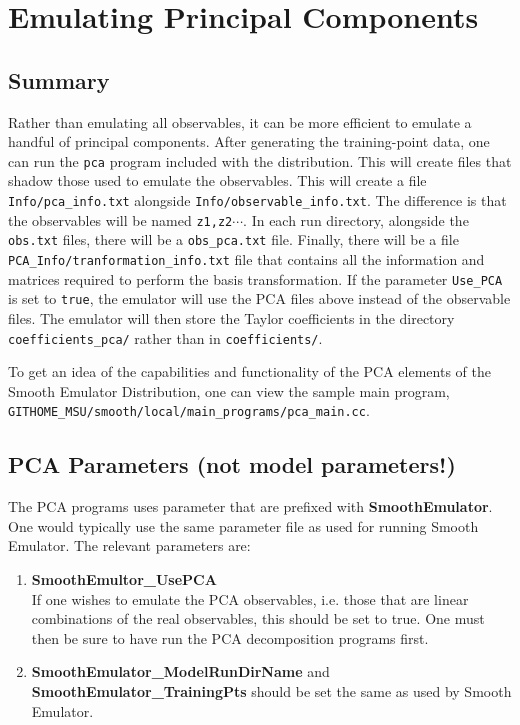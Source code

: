 \documentclass[main.tex]{subfiles}
\begin{document}
\setcounter{section}{5}
\section{Emulating Principal Components}\label{sec:pca}

\subsection{Summary}

Rather than emulating all observables, it can be more efficient to emulate a handful of principal components. After generating the training-point data, one can run the {\tt pca} program included with the distribution. This will create files that shadow those used to emulate the observables. This will create a file {\tt Info/pca\_info.txt} alongside {\tt Info/observable\_info.txt}. The difference is that the observables will be named {\tt z1,z2}$\cdots$. In each run directory, alongside the {\tt obs.txt} files, there will be a {\tt obs\_pca.txt} file. Finally, there will be a file {\tt PCA\_Info/tranformation\_info.txt} file that contains all the information and matrices required to perform the basis transformation. If the parameter {\tt Use\_PCA} is set to {\tt true}, the emulator will use the PCA files above instead of the observable files. The emulator will then store the Taylor coefficients in the directory {\tt coefficients\_pca/} rather than in {\tt coefficients/}. 

To get an idea of the capabilities and functionality of the PCA elements of the Smooth Emulator Distribution, one can view the sample main program,\\
{\tt GITHOME\_MSU/smooth/local/main\_programs/pca\_main.cc}. 

\subsection{PCA Parameters (not model parameters!)}
The PCA programs uses parameter that are prefixed with {\bf SmoothEmulator}. One would typically use the same parameter file as used for running Smooth Emulator. The relevant parameters are:
\begin{enumerate}\itemsep=0pt
\item {\bf SmoothEmultor\_UsePCA}\\
If one wishes to emulate the PCA observables, i.e. those that are linear combinations of the real observables, this should be set to true. One must then be sure to have run the PCA decomposition programs first. 
\item {\bf SmoothEmulator\_ModelRunDirName} and {\bf SmoothEmulator\_TrainingPts} should be set the same as used by Smooth Emulator.
\end{enumerate}
\end{document}
